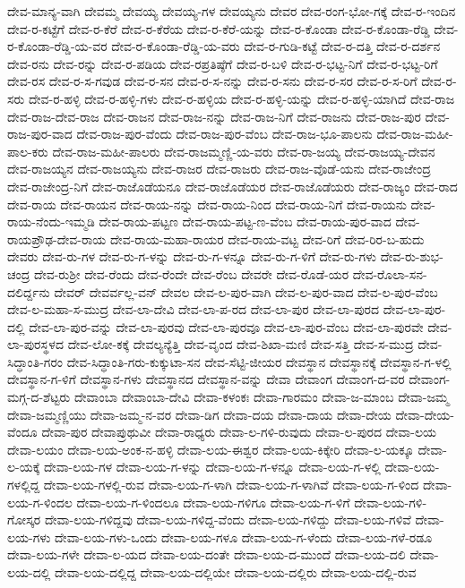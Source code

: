 ದೇವ-ಮಾನ್ಯ-ವಾಗಿ
ದೇವಮ್ಮ
ದೇವಯ್ಯ
ದೇವಯ್ಯ-ಗಳ
ದೇವಯ್ಯನು
ದೇವರ
ದೇವ-ರಂಗ-ಭೋ-ಗಕ್ಕೆ
ದೇವ-ರ-ಇಂದಿನ
ದೇವ-ರ-ಕಟ್ಟೆಗೆ
ದೇವ-ರ-ಕೆರೆ
ದೇವ-ರ-ಕೆರೆಯ
ದೇವ-ರ-ಕೆರೆ-ಯನ್ನು
ದೇವ-ರ-ಕೊಂಡಾ
ದೇವ-ರ-ಕೊಂಡಾ-ರೆಡ್ಡಿ
ದೇವ-ರ-ಕೊಂಡಾ-ರೆಡ್ಡಿ-ಯ-ವರ
ದೇವ-ರ-ಕೊಂಡಾ-ರೆಡ್ಡಿ-ಯ-ವರು
ದೇವ-ರ-ಗುಡಿ-ಕಟ್ಟೆ
ದೇವ-ರ-ದತ್ತಿ
ದೇವ-ರ-ದರ್ಶನ
ದೇವ-ರನು
ದೇವ-ರನ್ನು
ದೇವ-ರ-ಪಡಿಯ
ದೇವ-ರಪ್ರತಿಷ್ಠೆಗೆ
ದೇವ-ರ-ಬಳಿ
ದೇವ-ರ-ಭಟ್ಟ-ನಿಗೆ
ದೇವ-ರ-ಭಟ್ಟ-ರಿಗೆ
ದೇವ-ರಸ
ದೇವ-ರ-ಸ-ಗವುಡ
ದೇವ-ರ-ಸನ
ದೇವ-ರ-ಸ-ನನ್ನು
ದೇವ-ರ-ಸನು
ದೇವ-ರ-ಸರ
ದೇವ-ರ-ಸ-ರಿಗೆ
ದೇವ-ರ-ಸರು
ದೇವ-ರ-ಹಳ್ಳಿ
ದೇವ-ರ-ಹಳ್ಳಿ-ಗಳು
ದೇವ-ರ-ಹಳ್ಳಿಯ
ದೇವ-ರ-ಹಳ್ಳಿ-ಯನ್ನು
ದೇವ-ರ-ಹಳ್ಳಿ-ಯಾಗಿದೆ
ದೇವ-ರಾಜ
ದೇವ-ರಾಜ-ದೇವ-ರಾಜ
ದೇವ-ರಾಜನ
ದೇವ-ರಾಜ-ನನ್ನು
ದೇವ-ರಾಜ-ನಿಗೆ
ದೇವ-ರಾಜನು
ದೇವ-ರಾಜ-ಪುರ
ದೇವ-ರಾಜ-ಪುರ-ವಾದ
ದೇವ-ರಾಜ-ಪುರ-ವೆಂದು
ದೇವ-ರಾಜ-ಪುರ-ವೆಂಬ
ದೇವ-ರಾಜ-ಭೂ-ಪಾಲನು
ದೇವ-ರಾಜ-ಮಹೀ-ಪಾಲ-ಕರು
ದೇವ-ರಾಜ-ಮಹೀ-ಪಾಲರು
ದೇವ-ರಾಜಮ್ಮಣ್ಣಿ-ಯ-ವರು
ದೇವ-ರಾ-ಜಯ್ಯ
ದೇವ-ರಾಜಯ್ಯ-ದೇವನ
ದೇವ-ರಾಜಯ್ಯನ
ದೇವ-ರಾಜಯ್ಯನು
ದೇವ-ರಾಜರ
ದೇವ-ರಾಜರು
ದೇವ-ರಾಜ-ವೊಡೆ-ಯನು
ದೇವ-ರಾಜೇಂದ್ರ
ದೇವ-ರಾಜೇಂದ್ರ-ನಿಗೆ
ದೇವ-ರಾಜೊಡೆಯನೂ
ದೇವ-ರಾಜೊಡೆಯರ
ದೇವ-ರಾಜೊಡೆಯರು
ದೇವ-ರಾಜ್ಯಂ
ದೇವ-ರಾದ
ದೇವ-ರಾಯ
ದೇವ-ರಾಯನ
ದೇವ-ರಾಯ-ನನ್ನು
ದೇವ-ರಾಯ-ನಿಂದ
ದೇವ-ರಾಯ-ನಿಗೆ
ದೇವ-ರಾಯನು
ದೇವ-ರಾಯ-ನೆಂದು-ಇಮ್ಮಡಿ
ದೇವ-ರಾಯ-ಪಟ್ಟಣ
ದೇವ-ರಾಯ-ಪಟ್ಟ-ಣ-ವೆಂಬ
ದೇವ-ರಾಯ-ಪುರ-ವಾದ
ದೇವ-ರಾಯಪ್ರೌಢ-ದೇವ-ರಾಯ
ದೇವ-ರಾಯ-ಮಹಾ-ರಾಯರ
ದೇವ-ರಾಯ-ವಟ್ಟ
ದೇವ-ರಿಗೆ
ದೇವ-ರಿರ-ಬ-ಹುದು
ದೇವರು
ದೇವ-ರು-ಗಳ
ದೇವ-ರು-ಗ-ಳನ್ನು
ದೇವ-ರು-ಗ-ಳನ್ನೂ
ದೇವ-ರು-ಗ-ಳಿಗೆ
ದೇವ-ರು-ಗಳು
ದೇವ-ರು-ಶುಭ-ಚಂದ್ರ
ದೇವ-ರುಶ್ರೀ
ದೇವ-ರೆಂದು
ದೇವ-ರೆಂದೇ
ದೇವ-ರೆಂಬ
ದೇವರೇ
ದೇವ-ರೊಡೆ-ಯರ
ದೇವ-ರೊಲಾ-ಸನ-ದಲಿರ್ದ್ದನು
ದೇವರ್
ದೇವರ್ವಲ್ಲ-ವನ್
ದೇವಲ
ದೇವ-ಲ-ಪುರ-ವಾಗಿ
ದೇವ-ಲ-ಪುರ-ವಾದ
ದೇವ-ಲ-ಪುರ-ವೆಂಬ
ದೇವ-ಲ-ಮಹಾ-ಸ-ಮುದ್ರ
ದೇವ-ಲಾ-ದೇವಿ
ದೇವ-ಲಾ-ಪ-ರದ
ದೇವ-ಲಾ-ಪುರ
ದೇವ-ಲಾ-ಪುರದ
ದೇವ-ಲಾ-ಪುರ-ದಲ್ಲಿ
ದೇವ-ಲಾ-ಪುರ-ವನ್ನು
ದೇವ-ಲಾ-ಪುರವು
ದೇವ-ಲಾ-ಪುರವೂ
ದೇವ-ಲಾ-ಪುರ-ವೆಂಬ
ದೇವ-ಲಾ-ಪುರವೇ
ದೇವ-ಲಾ-ಪುರಸ್ಥಳದ
ದೇವ-ಲೋ-ಕಕ್ಕೆ
ದೇವಲ್ಯನ್ಯೆತ್ತಿ
ದೇವ-ವೃಂದ
ದೇವ-ಶಿಖಾ-ಮಣಿ
ದೇವ-ಸತ್ತಿ
ದೇವ-ಸ-ಮುದ್ರ
ದೇವ-ಸಿದ್ಧಾಂತಿ-ಗರಂ
ದೇವ-ಸಿದ್ಧಾಂತಿ-ಗರು-ಕುಕ್ಕುಟಾ-ಸನ
ದೇವ-ಸೆಟ್ಟಿ-ಜೀಯರ
ದೇವಸ್ಥಾನ
ದೇವಸ್ಥಾನಕ್ಕೆ
ದೇವಸ್ಥಾನ-ಗ-ಳಲ್ಲಿ
ದೇವಸ್ಥಾನ-ಗ-ಳಿಗೆ
ದೇವಸ್ಥಾನ-ಗಳು
ದೇವಸ್ಥಾನದ
ದೇವಸ್ಥಾನ-ವನ್ನು
ದೇವಾ
ದೇವಾಂಗ
ದೇವಾಂಗ-ದ-ವರ
ದೇವಾಂಗ-ಮಗ್ಗ-ದ-ಶೆಟ್ಟರು
ದೇವಾಂಬಾ
ದೇವಾಂಬಾ-ದೇವಿ
ದೇವಾ-ಕಳಂಕಃ
ದೇವಾ-ಗಾರಮಂ
ದೇವಾ-ಜ-ಮಾಂಬ
ದೇವಾ-ಜಮ್ಮ
ದೇವಾ-ಜಮ್ಮಣ್ಣಿಯು
ದೇವಾ-ಜಮ್ಮ-ನ-ವರ
ದೇವಾ-ಡಿಗ
ದೇವಾ-ದಯ
ದೇವಾ-ದಾಯ
ದೇವಾ-ದೇಯ
ದೇವಾ-ದೇಯ-ವೆಂದೂ
ದೇವಾ-ಪುರ
ದೇವಾಪ್ರುಥುವೀ
ದೇವಾ-ರಾಧ್ಯರು
ದೇವಾ-ಲ-ಗಳಿ-ರುವುದು
ದೇವಾ-ಲ-ಪುರದ
ದೇವಾ-ಲಯ
ದೇವಾ-ಲಯಂ
ದೇವಾ-ಲಯ-ಅಂಕ-ನ-ಹಳ್ಳಿ
ದೇವಾ-ಲಯ-ಈಶ್ವರ
ದೇವಾ-ಲಯ-ಕಿಕ್ಕೇರಿ
ದೇವಾ-ಲ-ಯಕ್ಕೂ
ದೇವಾ-ಲ-ಯಕ್ಕೆ
ದೇವಾ-ಲಯ-ಗಳ
ದೇವಾ-ಲಯ-ಗ-ಳನ್ನು
ದೇವಾ-ಲಯ-ಗ-ಳನ್ನೂ
ದೇವಾ-ಲಯ-ಗ-ಳಲ್ಲಿ
ದೇವಾ-ಲಯ-ಗಳಲ್ಲಿದ್ದ
ದೇವಾ-ಲಯ-ಗಳಲ್ಲಿ-ರುವ
ದೇವಾ-ಲಯ-ಗ-ಳಾಗಿ
ದೇವಾ-ಲಯ-ಗ-ಳಾಗಿವೆ
ದೇವಾ-ಲಯ-ಗ-ಳಿಂದ
ದೇವಾ-ಲಯ-ಗ-ಳಿಂದಲ
ದೇವಾ-ಲಯ-ಗ-ಳಿಂದಲೂ
ದೇವಾ-ಲಯ-ಗಳಿಗೂ
ದೇವಾ-ಲಯ-ಗ-ಳಿಗೆ
ದೇವಾ-ಲಯ-ಗಳಿ-ಗೋಸ್ಕರ
ದೇವಾ-ಲಯ-ಗಳಿದ್ದವು
ದೇವಾ-ಲಯ-ಗಳಿದ್ದ-ವೆಂದು
ದೇವಾ-ಲಯ-ಗಳಿದ್ದು
ದೇವಾ-ಲಯ-ಗಳಿವೆ
ದೇವಾ-ಲಯ-ಗಳು
ದೇವಾ-ಲಯ-ಗಳು-ಒಂದು
ದೇವಾ-ಲಯ-ಗಳೂ
ದೇವಾ-ಲಯ-ಗ-ಳೆಂದು
ದೇವಾ-ಲಯ-ಗಳೆ-ರಡೂ
ದೇವಾ-ಲಯ-ಗಳೇ
ದೇವಾ-ಲ-ಯದ
ದೇವಾ-ಲಯ-ದಂತೇ
ದೇವಾ-ಲಯ-ದ-ಮುಂದೆ
ದೇವಾ-ಲಯ-ದಲಿ
ದೇವಾ-ಲಯ-ದಲ್ಲಿ
ದೇವಾ-ಲಯ-ದಲ್ಲಿದ್ದ
ದೇವಾ-ಲಯ-ದಲ್ಲಿಯೇ
ದೇವಾ-ಲಯ-ದಲ್ಲಿರು
ದೇವಾ-ಲಯ-ದಲ್ಲಿ-ರುವ
